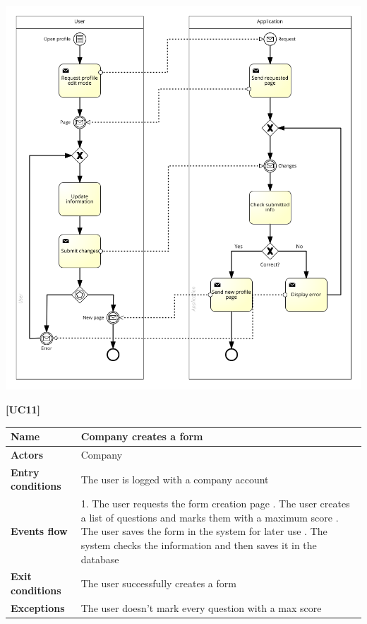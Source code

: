 \documentclass[11pt,twoside]{article}
\begin{document}
\begin{center}
\includegraphics[width=\textwidth]{Images/UC10}
\end{center}

\newpage

\large{\textbf{[UC11]}} \\
\begin{table}[H]
\begin{tabular}{| p{} | p{} |}
\hline
\textbf{Name}
& Company creates a form \\
\hline
\textbf{Actors}
& Company \\
\hline
\textbf{Entry conditions}
& The user is logged with a company account \\
\hline
\textbf{Events flow}
& 1. The user requests the form creation page \newline
2. The user creates a list of questions and marks them with a maximum score \newline
3. The user saves the form in the system for later use \newline
4. The system checks the information and then saves it in the database \\
\hline
\textbf{Exit conditions}
& The user successfully creates a form \\
\hline
\textbf{Exceptions}
& The user doesn't mark every question with a max score \\
\hline
\end{tabular}
\end{table}
\end{document}
